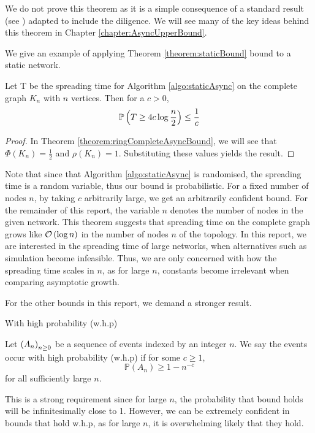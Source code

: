 We do not prove this theorem as it is a simple consequence of a standard result (see \cite{complexNetworksRumourSpreading}) adapted to include the diligence. We will see many of the key ideas behind this theorem in Chapter \ref{chapter:AsyncUpperBound}.

We give an example of applying Theorem \ref{theorem:staticBound} bound to a static network.

\begin{theorem}
	Let T be the spreading time for Algorithm \ref{algo:staticAsync} on the complete graph $K_n$ with $n$ vertices. Then for a $c > 0$,
	$$
		\mathbb{P}\left( T \geq 4c \log \frac{n}{2} \right) \leq \frac{1}{c} 
	$$
\end{theorem}

\begin{proof}
	In Theorem \ref{theorem:ringCompleteAsyncBound}, we will see that $\Phi(K_n) = \frac{1}{2}$ and $\rho(K_n) = 1$. Substituting these values yields the result.
\end{proof}

Note that since that Algorithm \ref{algo:staticAsync} is randomised, the spreading time is a random variable, thus our bound is probabilistic. 
For a fixed number of nodes $n$, by taking $c$ arbitrarily large, we get an arbitrarily confident bound.
For the remainder of this report, the variable $n$ denotes the number of nodes in the given network.
This theorem suggests that spreading time on the complete graph grows like 
$
	\mathcal{O} \left( \log n \right)
$
in the number of nodes $n$ of the topology. In this report, we are interested in the spreading time of large networks, when alternatives such as simulation become infeasible. Thus, we are only concerned with how the spreading time scales in $n$, as for large $n$, constants become irrelevant when comparing asymptotic growth.

For the other bounds in this report, we demand a stronger result.

\begin{definition}
	With high probability (w.h.p)

	\noindent
	Let $\left( A_n \right)_{n \geq 0}$ be a sequence of events indexed by an integer $n$. We say the events occur with high probability (w.h.p) if for some $c \geq 1$, 
	$$
		\mathbb{P}(A_n) \geq 1 - n^{-c}
	$$ for all sufficiently large $n$.
\end{definition}

This is a strong requirement since for large $n$, the probability that bound holds will be infinitesimally close to 1. However, we can be extremely confident in bounds that hold w.h.p, as for large $n$, it is overwhelming likely that they hold.

